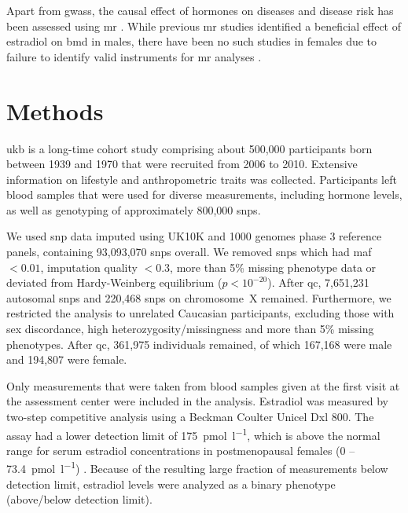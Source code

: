 \documentclass[draft]{scrbook}
\begin{document}
Apart from \glspl{gwas}, the causal effect of hormones on diseases and disease risk has been assessed using \gls{mr} \cite{Eriksson2018b,Ruth2020d, Nethander2018a}.
While previous \gls{mr} studies identified a beneficial effect of estradiol on \gls{bmd} in males, there have been no such studies in females due to failure to identify valid instruments for \gls{mr} analyses \cite{Eriksson2018b, Nethander2018a}.

\section{Methods} \label{p1methods}
\Gls{ukb} is a long-time cohort study comprising about 500,000 participants born between 1939 and 1970 that were recruited from 2006 to 2010.
Extensive information on lifestyle and anthropometric traits was collected.
Participants left blood samples that were used for diverse measurements, including hormone levels, as well as genotyping of approximately 800,000 \glspl{snp}.

We used \gls{snp} data imputed using UK10K and 1000 genomes phase 3 reference panels, containing 93,093,070 \glspl{snp} overall.
We removed \glspl{snp} which had \gls{maf} $ < 0.01$, imputation quality $ < 0.3 $, more than 5\% missing phenotype data or deviated from Hardy-Weinberg equilibrium ($p < 10^{-20}$).
After \gls{qc}, 7,651,231 autosomal \glspl{snp} and 220,468 \glspl{snp} on chromosome~X remained. Furthermore, we restricted the analysis to unrelated Caucasian participants, excluding those with sex discordance, high heterozygosity/missingness and more than 5\% missing phenotypes. After \gls{qc}, 361,975 individuals remained, of which 167,168 were male and 194,807 were female.

Only measurements that were taken from blood samples given at the first visit at the assessment center were included in the analysis.
Estradiol was measured by two-step competitive analysis using a Beckman Coulter Unicel Dxl 800.
The assay had a lower detection limit of \qty{175}{\pmol\per\litre}, which is above the normal range for serum estradiol concentrations in postmenopausal females (0 -- \qty{73.4}{\pmol\per\litre}) \cite{Nakamoto2010a}.
Because of the resulting large fraction of measurements below detection limit, estradiol levels were analyzed as a binary phenotype (above/below detection limit).
\end{document}
